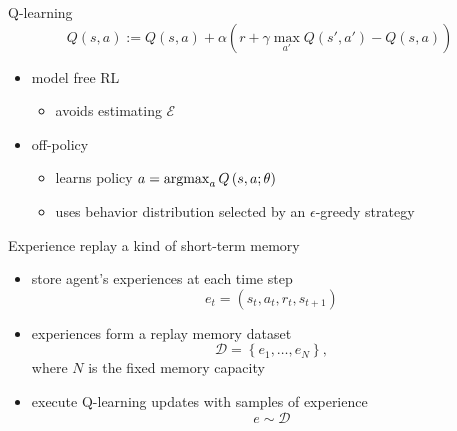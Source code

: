 \begin{frame}{Q-learning}
    \[
        Q\left(s,a\right) :=
        Q\left(s,a\right) +
        \alpha \left( r + \gamma\max_{a'}Q\left(s',a'\right) - Q\left(s,a\right) \right)
    \]
    \begin{itemize}\itemsep=12pt

        \item model free RL
        \vspace*{0.5em}
        \begin{itemize}
            \item avoids estimating $\mathcal{E}$
        \end{itemize}

        \item off-policy
        \vspace*{0.5em}
        \begin{itemize}
            \item learns policy $a = \mathop{\rm argmax}_{a}Q\left(s,a;\theta\right)$
            \item uses behavior distribution selected by an $\epsilon$-greedy strategy
        \end{itemize}
    
    \end{itemize}
\end{frame}

\begin{frame}{Experience replay}
    a kind of short-term memory
    \vspace*{0.5em}
    \begin{itemize}\itemsep=12pt

        \item store agent's experiences at each time step
        \[
            e_{t} = \left(s_{t},a_{t},r_{t},s_{t+1}\right)
        \]
        
        \item experiences form a replay memory dataset
        \[
            \mathcal{D} = \left\{ e_{1}, \ldots, e_{N} \right\},
        \]
        where $N$ is the fixed memory capacity

        \item execute Q-learning updates with samples of experience
        \[
            e \sim \mathcal{D}
        \]

    \end{itemize}
\end{frame}

